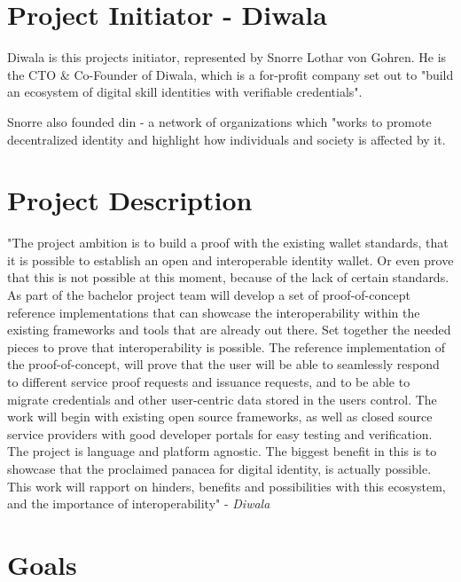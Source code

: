 \newpage

\section{Project Initiator - Diwala}

Diwala is this projects initiator, represented by Snorre Lothar von Gohren. He is the CTO \& Co-Founder of Diwala, which is a for-profit company set out to "build an ecosystem of digital skill identities with verifiable credentials"\cite{DiwalaAbout}.

Snorre also founded \acrfull{din} - a network of organizations which "works to promote decentralized identity and highlight how individuals and society is affected by it.

\section{Project Description}

"The project ambition is to build a proof with the existing wallet standards, that it is possible to establish an open and interoperable identity wallet. Or even prove that this is not possible at this moment, because of the lack of certain standards. As part of the bachelor project team will develop a set of proof-of-concept reference implementations that can showcase the interoperability within the existing frameworks and tools that are already out there. Set together the needed pieces to prove that interoperability is possible. The reference implementation of the proof-of-concept, will prove that the user will be able to seamlessly respond to different service proof requests and issuance requests, and to be able to migrate credentials and other user-centric data stored in the users control. The work will begin with existing open source frameworks, as well as closed source service providers with good developer portals for easy testing and verification. The project is language and platform agnostic. The biggest benefit in this is to showcase that the proclaimed panacea for digital identity, is actually possible. This work will rapport on hinders, benefits and possibilities with this ecosystem, and the importance of interoperability" \cite{ProjectDescription} - \textit{Diwala}






\section{Goals}

